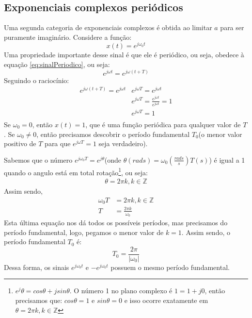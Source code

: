 \documentclass{article}
\begin{document}
  \subsection{Exponenciais complexos periódicos}
Uma segunda categoria de exponenciais complexos é obtida ao limitar \(a\) para ser puramente imaginário. Considere a função:
\begin{equation}
    x(t)=e^{j\omega_0t}
  \label{eq:}
\end{equation}
Uma propriedade importante desse sinal é que ele é periódico, ou seja, obedece à equação \ref{eq:sinalPeriodico}, ou seja:
\begin{equation}
  e^{j\omega t}=e^{j\omega(t+T)}
  \label{eq:}
\end{equation}
Seguindo o raciocínio:
\begin{align*}
  e^{j\omega(t+T)}=e^{j\omega t}&e^{j\omega T}=e^{j\omega t}\\
                  &e^{j\omega T}=\frac{e^{j\omega t}}{e^{j\omega t}}=1\\
                  &e^{j\omega T}=1\\
\end{align*}
Se \(\omega_0=0\), então \(x(t)=1\), que é uma função periódica para qualquer valor de \(T\). Se \(\omega_0 \neq 0\), então precisamos descobrir o período fundamental \(T_0\)(o menor valor positivo de \(T\) para que \(e^{j\omega T}=1\) seja verdadeiro).

Sabemos que o número  \(e^{j\omega_0T} = e^{j\theta}\)(onde \(\theta(rads)=\omega_0(\frac{rads}{s}) T(s)\)) é igual a 1 quando o angulo está em total rotação\footnote{\(e^j\theta = cos\theta + jsin\theta\). O número 1 no plano complexo é \(1=1+j0\), então precisamos que: \(cos\theta=1\) e  \(sin\theta=0\) e isso ocorre exatamente em \(\theta=2\pi k, k \in \mathbb{Z}\)}, ou seja:
\begin{align*}
   \theta=2\pi k, k \in \mathbb{Z}
\end{align*}
Assim sendo,
\begin{align*}
  \omega_0T&=2\pi k, k \in \mathbb{Z}\\
    T&=\frac{2\pi k}{\omega_0}
\end{align*}
Esta última equação nos dá todos os possíveis períodos, mas precisamos do período fundamental, logo, pegamos o menor valor de \(k=1\). Assim sendo, o período fundamental \(T_0\) é:
\begin{equation}
    T_0=\frac{2\pi}{|\omega_0|}
  \label{eq:}
\end{equation}
Dessa forma, os sinais \(e^{j\omega_0 t}\) e \(-e^{j\omega_0 t}\) possuem o mesmo período fundamental.
\end{document}
